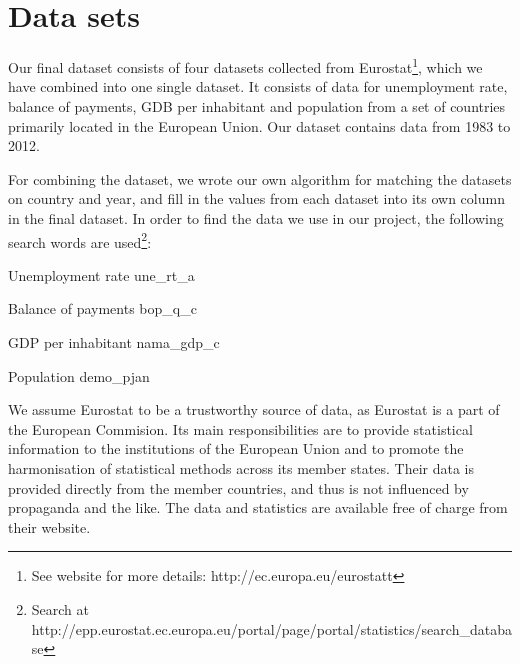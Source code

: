 \chapter{Data sets}
\label{DataSets}
Our final dataset consists of four datasets collected from Eurostat\footnote{See website for more details: http://ec.europa.eu/eurostatt}, which we have combined into one single dataset. It consists of data for unemployment rate, balance of payments, GDB per inhabitant and population from a set of countries primarily located in the European Union. Our dataset contains data from 1983 to 2012.

For combining the dataset, we wrote our own algorithm for matching the datasets on country and year, and fill in the values from each dataset into its own column in the final dataset. In order to find the data we use in our project, the following search words are used\footnote{Search at http://epp.eurostat.ec.europa.eu/portal/page/portal/statistics/search\_database}:

\begin{my_itemize}
\item{Unemployment rate} une\_rt\_a
\item{Balance of payments} bop\_q\_c
\item{GDP per inhabitant} nama\_gdp\_c
\item{Population} demo\_pjan
\end{my_itemize}

We assume Eurostat to be a trustworthy source of data, as Eurostat is a part of the European Commision. Its main responsibilities are to provide statistical information to the institutions of the European Union and to promote the harmonisation of statistical methods across its member states. Their data is provided directly from the member countries, and thus is not influenced by propaganda and the like. The data and statistics are available free of charge from their website.